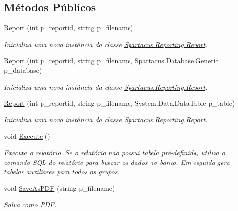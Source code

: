 \subsection*{Métodos Públicos}
\begin{DoxyCompactItemize}
\item 
\hyperlink{classSpartacus_1_1Reporting_1_1Report_afd782e43c614cea90611b30b419d560c}{Report} (int p\+\_\+reportid, string p\+\_\+filename)
\begin{DoxyCompactList}\small\item\em Inicializa uma nova instância da classe \hyperlink{classSpartacus_1_1Reporting_1_1Report}{Spartacus.\+Reporting.\+Report}. \end{DoxyCompactList}\item 
\hyperlink{classSpartacus_1_1Reporting_1_1Report_a8681c7155a9260ed9a14e48ab9c23d4c}{Report} (int p\+\_\+reportid, string p\+\_\+filename, \hyperlink{classSpartacus_1_1Database_1_1Generic}{Spartacus.\+Database.\+Generic} p\+\_\+database)
\begin{DoxyCompactList}\small\item\em Inicializa uma nova instância da classe \hyperlink{classSpartacus_1_1Reporting_1_1Report}{Spartacus.\+Reporting.\+Report}. \end{DoxyCompactList}\item 
\hyperlink{classSpartacus_1_1Reporting_1_1Report_ae51a138e5449202283c5f78c7cfba43a}{Report} (int p\+\_\+reportid, string p\+\_\+filename, System.\+Data.\+Data\+Table p\+\_\+table)
\begin{DoxyCompactList}\small\item\em Inicializa uma nova instância da classe \hyperlink{classSpartacus_1_1Reporting_1_1Report}{Spartacus.\+Reporting.\+Report}. \end{DoxyCompactList}\item 
void \hyperlink{classSpartacus_1_1Reporting_1_1Report_ad229668d54d0becc90678829f7357861}{Execute} ()
\begin{DoxyCompactList}\small\item\em Executa o relatório. Se o relatório não possui tabela pré-\/definida, utiliza o comando S\+Q\+L do relatório para buscar os dados no banco. Em seguida gera tabelas auxiliares para todos os grupos. \end{DoxyCompactList}\item 
void \hyperlink{classSpartacus_1_1Reporting_1_1Report_ab4c81908854b363a0a05c01b593f07fb}{Save\+As\+P\+D\+F} (string p\+\_\+filename)
\begin{DoxyCompactList}\small\item\em Salva como P\+D\+F. \end{DoxyCompactList}\end{DoxyCompactItemize}
